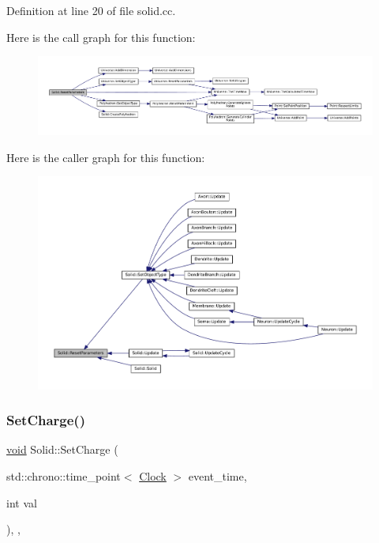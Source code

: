 Definition at line 20 of file solid.\+cc.

Here is the call graph for this function\+:\nopagebreak
\begin{figure}[H]
\begin{center}
\leavevmode
\includegraphics[width=350pt]{class_solid_ac43dc78fa7f6a3348fc99751ff6bbc52_cgraph}
\end{center}
\end{figure}
Here is the caller graph for this function\+:\nopagebreak
\begin{figure}[H]
\begin{center}
\leavevmode
\includegraphics[width=350pt]{class_solid_ac43dc78fa7f6a3348fc99751ff6bbc52_icgraph}
\end{center}
\end{figure}
\mbox{\label{class_solid_a37503e6b25f912254414e778af2e75cd}} 
\subsubsection{\texorpdfstring{Set\+Charge()}{SetCharge()}}
{\footnotesize\ttfamily \mbox{\hyperlink{glad_8h_a950fc91edb4504f62f1c577bf4727c29}{void}} Solid\+::\+Set\+Charge (\begin{DoxyParamCaption}\item[{std\+::chrono\+::time\+\_\+point$<$ \mbox{\hyperlink{universe_8h_a0ef8d951d1ca5ab3cfaf7ab4c7a6fd80}{Clock}} $>$}]{event\+\_\+time,  }\item[{int}]{val }\end{DoxyParamCaption})\hspace{0.3cm}{\ttfamily [inline]}, {\ttfamily [final]}, {\ttfamily [virtual]}}



